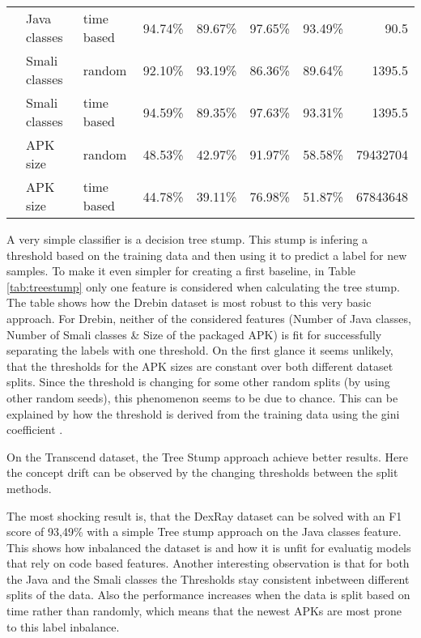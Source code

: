 \begin{table*}[t!]
{\begin{tabularx}{\linewidth}{@{}l l l r r r r r@{}}
                   & Java classes & time based & 94.74\% & 89.67\% & 97.65\% & 93.49\% & 90.5 \\
                   & Smali classes & random    & 92.10\% & 93.19\% & 86.36\% & 89.64\% & 1395.5 \\
                   & Smali classes & time based & 94.59\% & 89.35\% & 97.63\% & 93.31\% & 1395.5 \\
                   & APK size     & random     & 48.53\% & 42.97\% & 91.97\% & 58.58\% & 79432704 \\
                   & APK size & time based & 44.78\% & 39.11\% & 76.98\% & 51.87\% & 67843648 \\
            \bottomrule
        \end{tabularx}
    }
\end{table*}

A very simple classifier is a decision tree stump.
This stump is infering a threshold based on the training data and then using it to predict a label for new samples.
To make it even simpler for creating a first baseline, in Table \ref{tab:treestump} only one feature is considered when calculating the tree stump.
The table shows how the Drebin dataset is most robust to this very basic approach.
For Drebin, neither of the considered features (Number of Java classes, Number of Smali classes \& Size of the packaged APK)
is fit for successfully separating the labels with one threshold.
On the first glance it seems unlikely, that the thresholds for the APK sizes are constant over both different dataset splits.
Since the threshold is changing for some other random splits (by using other random seeds),
this phenomenon seems to be due to chance.
This can be explained by how the threshold is derived from the training data
using the gini coefficient \cite{gini}.

On the Transcend dataset, the Tree Stump approach achieve better results.
Here the concept drift can be observed by the changing thresholds between the split methods.

The most shocking result is, that the DexRay dataset can be solved with an F1 score of 93,49\% 
with a simple Tree stump approach on the Java classes feature.
This shows how inbalanced the dataset is and how it is unfit for evaluatig models 
that rely on code based features.
Another interesting observation is that for both the Java and the Smali classes the 
Thresholds stay consistent inbetween different splits of the data.
Also the performance increases when the data is split based on time rather than randomly, 
which means that the newest APKs are most prone to this label inbalance.

